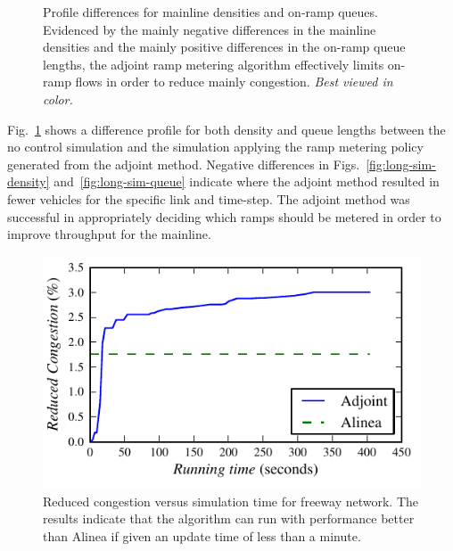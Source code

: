 \begin{figure}[h]
\centering%
\hfill%
%
\caption[Profile differences for mainline densities and on-ramp queues for controlled vs. uncontrolled instances.]{Profile differences for mainline densities and on-ramp queues. Evidenced
	by the mainly negative differences in the mainline densities and the
	mainly positive differences in the on-ramp queue lengths, the adjoint
	ramp metering algorithm effectively limits on-ramp flows in order to
	reduce mainly congestion. \textit{Best viewed in color.}\label{fig:long-sim}}
\end{figure}			

Fig.~\ref{fig:long-sim} shows a difference profile for both density and queue lengths between the
no control simulation and the simulation applying the ramp metering
policy generated from the adjoint method. Negative differences in
Figs.~\ref{fig:long-sim-density} and~\ref{fig:long-sim-queue}
indicate where the adjoint method resulted in fewer vehicles for the
specific link and time-step. The adjoint method was successful in
appropriately deciding which ramps should be metered in order to improve
throughput for the mainline.

\begin{figure}[h]
\centering%
\includegraphics[width=0.45\columnwidth]{previous-articles/adjoint/images/longsim}%
\caption{Reduced congestion versus simulation time for freeway network. The results indicate that the algorithm can run with performance better than Alinea if given an update time of less than a minute.}%
\label{fig:running-time}%
\end{figure}
								
